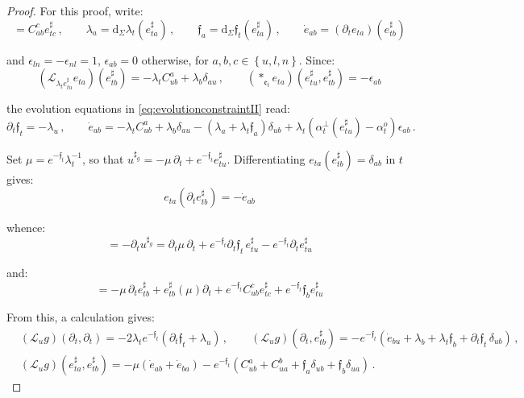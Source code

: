 \documentclass[10pt,reqno,a4paper]{amsart}
\theoremstyle{plain}
\theoremstyle{definition}
\theoremstyle{remark}
\theoremstyle{remark}
\def\dd{\mathrm{d}}
\def\cL{\mathcal{L}}
\def\cL{\mathcal{L}}
\def\fre{\mathfrak{e}}
\renewcommand{\(}{ (}
\renewcommand{\)}{ )}
\newcommand{\frf}{\mathfrak{f}}
\begin{document}
\begin{proof}
For this proof, write:
\begin{equation*}
 [e^{\sharp}_{ta},e^{\sharp}_{tb}] = C^c_{ab}e^{\sharp}_{tc}\, , \qquad   \lambda_a = \dd_{\Sigma}\lambda_t(e^{\sharp}_{ta})\, , \qquad \frf_a = \dd_{\Sigma}\frf_t(e^{\sharp}_{ta}) \, , \qquad \dot{e}_{ab} = (\partial_t e_{ta})(e^{\sharp}_{tb})
\end{equation*}

\noindent
and $\epsilon_{ln} = -\epsilon_{nl} = 1$, $\epsilon_{ab} = 0$ otherwise, for $a,b,c\in\left\{ u,l,n\right\}$. Since:
\begin{equation*}
(\cL_{\lambda_t e^{\sharp}_{tu}}e_{ta})(e^{\sharp}_{tb}) = -\lambda_t C^a_{ub} + \lambda_b\delta_{au}    \, , \qquad (\ast_{\fre_t}e_{ta})(e^{\sharp}_{tu},e^{\sharp}_{tb}) = -\epsilon_{ab}   
\end{equation*}

\noindent
the evolution equations in \eqref{eq:evolutionconstraintII} read:
\begin{equation}
\label{eq:evolutionframecomponents}
\partial_t\frf_t = -\lambda_u\, , \qquad \dot{e}_{ab} = -\lambda_t C^a_{ub} + \lambda_b\delta_{au} - (\lambda_a + \lambda_t\frf_a)\delta_{ub} + \lambda_t ( \alpha^{\perp}_t(e^{\sharp}_{tu}) - \alpha^o_t )\epsilon_{ab}\, .
\end{equation}

\noindent
Set $\mu = e^{-\frf_t}\lambda_t^{-1}$, so that $u^{\sharp_g} = -\mu\, \partial_t + e^{-\frf_t}e^{\sharp}_{tu}$. Differentiating $e_{ta}(e^{\sharp}_{tb}) = \delta_{ab}$ in $t$ gives:
\begin{equation*}
e_{ta}(\partial_t e^{\sharp}_{tb}) = -\dot{e}_{ab}  
\end{equation*}

\noindent
whence:
\begin{equation*}
[u^{\sharp_g},\partial_t] = -\partial_t u^{\sharp_g} = \partial_t\mu\, \partial_t + e^{-\frf_t}\partial_t\frf_t\, e^{\sharp}_{tu} - e^{-\frf_t}\partial_t e^{\sharp}_{tu}
\end{equation*}

\noindent
and:
\begin{equation*}
[u^{\sharp_g} , e^{\sharp}_{tb}] = -\mu\, \partial_te^{\sharp}_{tb} + e^{\sharp}_{tb}(\mu)\partial_t + e^{-\frf_t}C^c_{ub}e^{\sharp}_{tc} + e^{-\frf_t}\frf_b e^{\sharp}_{tu}    
\end{equation*}

\noindent
From this, a calculation gives:
\begin{eqnarray*}
& (\cL_{u}g)(\partial_t,\partial_t) = -2\lambda_t e^{-\frf_t} ( \partial_t\frf_t + \lambda_u )\, , \qquad (\cL_{u}g)(\partial_t,e^{\sharp}_{tb}) = -e^{-\frf_t} ( \dot{e}_{bu} + \lambda_b + \lambda_t\frf_b + \partial_t\frf_t\, \delta_{ub} )\, , \\
& (\cL_{u}g)(e^{\sharp}_{ta},e^{\sharp}_{tb}) = -\mu ( \dot{e}_{ab} + \dot{e}_{ba} ) - e^{-\frf_t} ( C^a_{ub} + C^b_{ua} + \frf_a\delta_{ub} + \frf_b\delta_{ua} )\, .
\end{eqnarray*}


\end{proof}
\end{document}
